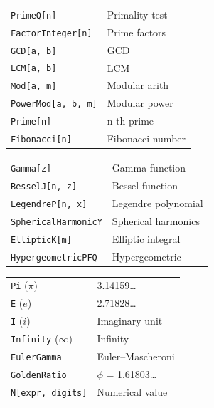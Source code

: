 \documentclass[10pt]{extarticle}
\begin{document}
\begin{multicols}{2}
\begin{tabularx}{\linewidth}{@{}l@{\enspace}Y@{}}
\texttt{PrimeQ[n]}                  & Primality test \\
\texttt{FactorInteger[n]}           & Prime factors \\
\texttt{GCD[a, b]}                  & GCD \\
\texttt{LCM[a, b]}                  & LCM \\
\texttt{Mod[a, m]}                  & Modular arith \\
\texttt{PowerMod[a, b, m]}         & Modular power \\
\texttt{Prime[n]}                   & n-th prime \\
\texttt{Fibonacci[n]}              & Fibonacci number \\
\end{tabularx}

\begin{tabularx}{\linewidth}{@{}l@{\enspace}Y@{}}
\texttt{Gamma[z]}                    & Gamma function \\
\texttt{BesselJ[n, z]}              & Bessel function \\
\texttt{LegendreP[n, x]}           & Legendre polynomial \\
\texttt{SphericalHarmonicY}         & Spherical harmonics \\
\texttt{EllipticK[m]}               & Elliptic integral \\
\texttt{HypergeometricPFQ}         & Hypergeometric \\
\end{tabularx}

\begin{tabularx}{\linewidth}{@{}l@{\enspace}Y@{}}
\texttt{Pi} ($\pi$)                 & 3.14159\ldots \\
\texttt{E} ($e$)                    & 2.71828\ldots \\
\texttt{I} ($i$)                    & Imaginary unit \\
\texttt{Infinity} ($\infty$)       & Infinity \\
\texttt{EulerGamma}                & Euler--Mascheroni \\
\texttt{GoldenRatio}               & $\phi$ = 1.61803\ldots \\
\texttt{N[expr, digits]}           & Numerical value \\
\end{tabularx}

\end{multicols}
\end{document}
